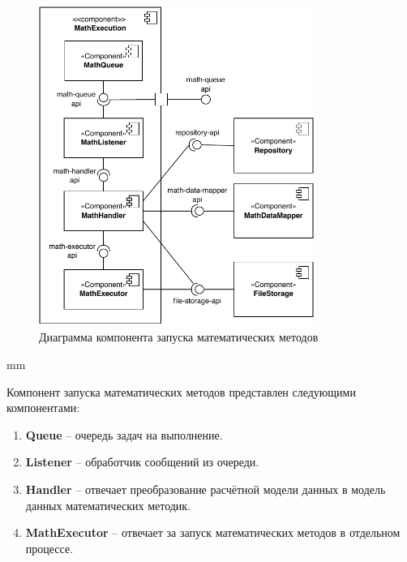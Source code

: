 \begin{figure}[H]
	\hspace*{-2.5 cm}\includegraphics[width=0.8\textwidth]{architecture/pictures/executor/component_detailed}
	\caption{Диаграмма компонента запуска математических методов}
	\label{pic:architecture__executor-detailed-component}
\end{figure}
 mm

Компонент запуска математических методов представлен следующими компонентами:
\begin{enumerate}
	\item {
		\textbf{Queue} -- очередь задач на выполнение.
	}
	\item {
		\textbf{Listener} -- обработчик сообщений из очереди.
	}
	\item {
		\textbf{Handler} -- отвечает преобразование расчётной модели данных в модель данных математических методик.
	}
	\item {
		\textbf{MathExecutor} -- отвечает за запуск математических методов в отдельном процессе.
	}
\end{enumerate}